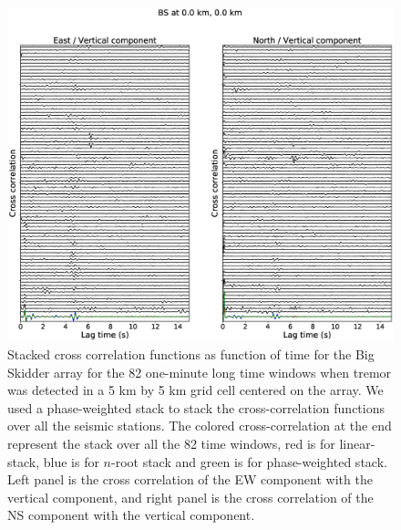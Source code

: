 \documentclass[draft]{agujournal2019}
\begin{document}
\begin{figure}
\noindent\includegraphics[width=\textwidth, trim={5cm 2cm 5cm 3.5cm},clip]{figures/BS_000_000_PWS.eps}
\caption{Stacked cross correlation functions as function of time for the Big Skidder array for the 82 one-minute long time windows when tremor was detected in a 5 km by 5 km grid cell centered on the array. We used a phase-weighted stack to stack the cross-correlation functions over all the seismic stations. The colored cross-correlation at the end represent the stack over all the 82 time windows, red is for linear-stack, blue is for $n$-root stack and green is for phase-weighted stack. Left panel is the cross correlation of the EW component with the vertical component, and right panel is the cross correlation of the NS component with the vertical component.}
\label{pngfiguresample}
\end{figure}
\end{document}
